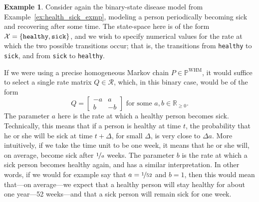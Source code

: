 \documentclass[10pt,a4paper]{paper}
\theoremstyle{definition}
\newtheorem{exmp}{Example}
\newcommand{\reals}{\mathbb{R}}
\newcommand{\states}{\mathcal{X}}
\newcommand{\processes}{\mathbb{P}}
\newcommand{\whmprocesses}{\processes^{\mathrm{WHM}}}
\begin{document}
\begin{exmp}\label{exmp:example_rateset_simple_model}
Consider again the binary-state disease model from Example~\ref{ex:health_sick_exmp}, modeling a person periodically becoming sick and recovering after some time. The state-space here is of the form $\states=\{\text{{\tt healthy}},\text{{\tt sick}}\}$, and we wish to specify numerical values for the rate at which the two possible transitions occur; that is, the transitions from {\tt healthy} to {\tt sick}, and from {\tt sick} to {\tt healthy}.

If we were using a precise homogeneous Markov chain $P\in\whmprocesses$, it would suffice to select a single rate matrix $Q\in\mathcal{R}$, which, in this binary case, would be of the form
\begin{equation*}
Q = \left[ \begin{array}{rr}
-a & a \\
b & -b
\end{array}\right] \text{ for some } a,b\in\reals_{\geq0}.
\end{equation*}
The parameter $a$ here is the rate at which a healthy person becomes sick.
Technically, this means that if a person is healthy at time $t$, the probability that he or she will be sick at time $t+\Delta$, for small $\Delta$, is very close to $\Delta a$. More intuitively, if we take the time unit to be one week, it means that he or she will, on average, become sick after $\nicefrac{1}{a}$ weeks. The parameter $b$ is the rate at which a sick person becomes healthy again, and has a similar interpretation. In other words, if we would for example say that $a=\nicefrac{1}{52}$ and $b=1$, then this would mean that---on average---we expect that a healthy person will stay healthy for about one year---52 weeks---and that a sick person will remain sick for one week.



\end{exmp}
\end{document}

